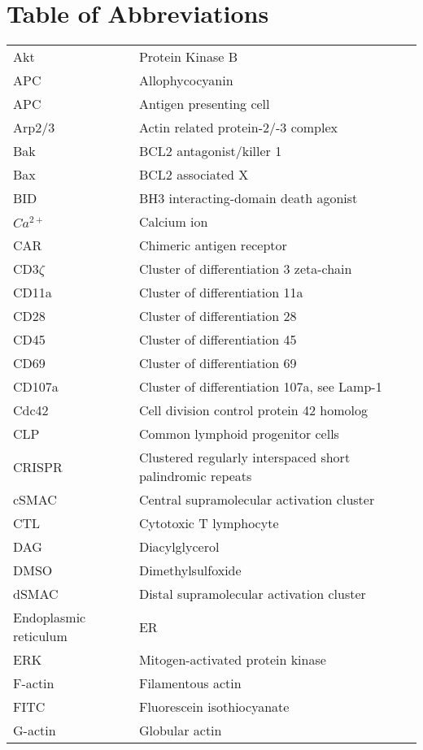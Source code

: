 \documentclass[phd,tocprelim]{cornell}
\renewcommand{\caption}[1]{\singlespacing\hangcaption{#1}\normalspacing}
\begin{document}
\section{Table of Abbreviations}
\begin{table}
\caption{Table of Abbreviations}
\centering
\begin{tabular}{l m{10cm} l}
	\toprule
	Akt & Protein Kinase B \\
	APC & Allophycocyanin \\
	APC & Antigen presenting cell \\
	Arp2/3 	& Actin related protein-2/-3 complex \\
	Bak & BCL2 antagonist/killer 1 \\
	Bax & BCL2 associated X \\
	BID & BH3 interacting-domain death agonist \\
	$Ca^{2+}$ & Calcium ion \\
	CAR & Chimeric antigen receptor \\
	CD3$\zeta$ & Cluster of differentiation 3 zeta-chain \\
	CD11a & Cluster of differentiation 11a \\
	CD28 & Cluster of differentiation 28 \\
	CD45 & Cluster of differentiation 45 \\
	CD69 & Cluster of differentiation 69 \\
	CD107a & Cluster of differentiation 107a, see Lamp-1 \\
	Cdc42 & Cell division control protein 42 homolog \\
	CLP & Common lymphoid progenitor cells \\
	CRISPR & Clustered regularly interspaced short palindromic repeats \\
	cSMAC & Central supramolecular activation cluster \\
	CTL & Cytotoxic T lymphocyte \\
	DAG & Diacylglycerol \\
	DMSO & Dimethylsulfoxide \\
	dSMAC & Distal supramolecular activation cluster \\
	Endoplasmic reticulum & ER \\	
	ERK  & Mitogen-activated protein kinase \\
	F-actin & Filamentous actin \\
	FITC & Fluorescein isothiocyanate \\
	G-actin & Globular actin \\

\end{tabular}
\end{table}
\end{document}
